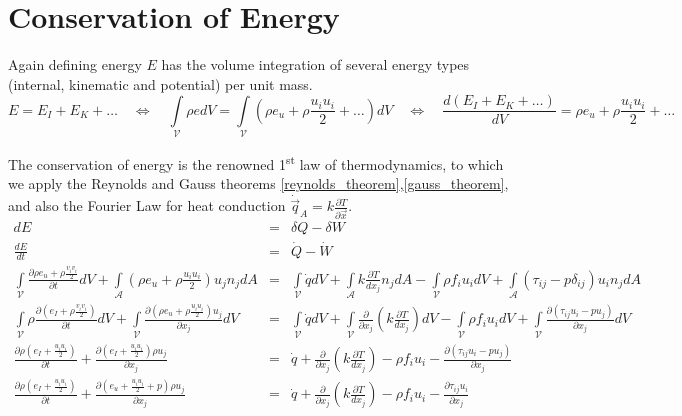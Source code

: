 
\section{Conservation of Energy}
Again defining energy $E$ has the volume integration of several energy types (internal, kinematic and potential) per unit mass.
\begin{equation}
E= E_I + E_K + \ldots \quad \Leftrightarrow \quad \int\limits_{\mathcal{V}} \rho e dV =  \int\limits_{\mathcal{V}} (\rho e_u+ \rho\frac{u_i u_i}{2} + \ldots) dV \quad  \Leftrightarrow \quad  \frac{d(E_I + E_K + \ldots) }{dV} = \rho e_u+ \rho\frac{u_i u_i}{2} + \ldots
\end{equation}

The conservation of energy is the renowned 1\textsuperscript{st} law of thermodynamics, to which we apply the Reynolds and Gauss theorems \eqref{reynolds_theorem},\eqref{gauss_theorem}, and also the Fourier Law for heat conduction $\dot{\vec{q}}_A = k\frac{\partial T}{\partial \vec{x}}$.
\begin{eqnarray}
    \label{differential_energy}
    dE &=& \delta Q- \delta W \\
    \frac{dE}{dt} &=& \dot{Q} - \dot{W} \\
    \int\limits_{\mathcal{V}} \frac{\partial \rho e_u+ \rho\frac{v_iv_i}{2}}{\partial t} dV +  \int\limits_{\mathcal{A}} (\rho e_u + \rho\frac{u_i u_i}{2}) u_j n_j dA
    &=&  \int\limits_{\mathcal{V}} \dot{q} dV + \int\limits_{\mathcal{A}} k\frac{\partial T}{d x_j} n_j dA - \int\limits_{\mathcal{V}} \rho f_i u_i dV + \int\limits_{\mathcal{A}} \left(\tau_{ij}- p \delta_{ij} \right)u_i n_j dA \\
    \int\limits_{\mathcal{V}} \rho \frac{\partial \left( e_I+ \rho\frac{v_iv_i}{2}\right)}{\partial t} dV +  \int\limits_{\mathcal{V}} \frac{\partial \left(\rho e_u+ \rho\frac{u_i u_i}{2}\right) u_j}{\partial x_j} dV
    &=&  \int\limits_{\mathcal{V}} \dot{q} dV + \int\limits_{\mathcal{V}} \frac{\partial} {\partial x_j} \left( k\frac{\partial T}{d x_j} \right) dV - \int\limits_{\mathcal{V}} \rho f_i u_i dV + \int\limits_{\mathcal{V}} \frac{\partial \left(\tau_{ij}u_i- p u_j \right )}{\partial x_j} dV \\
    \frac{\partial \rho \left( e_I+ \frac{u_i u_i}{2} \right)}{\partial t} +  \frac{\partial \left( e_I + \frac{u_i u_i}{2}\right) \rho u_j}{\partial x_j}
    &=&  \dot{q} + \frac{\partial} {\partial x_j} \left( k\frac{\partial T}{d x_j} \right) - \rho f_i u_i - \frac{\partial \left(\tau_{ij}u_i- p u_j \right)}{\partial x_j} \\
	\frac{\partial \rho \left( e_I+ \frac{u_i u_i}{2} \right)}{\partial t} +  \frac{\partial \left( e_u + \frac{u_i u_i}{2} + p  \right)\rho u_j}{\partial x_j}
    &=&  \dot{q} + \frac{\partial} {\partial x_j} \left( k\frac{\partial T}{d x_j} \right) - \rho f_i u_i - \frac{\partial \tau_{ij}u_i}{\partial x_j}
\end{eqnarray}





